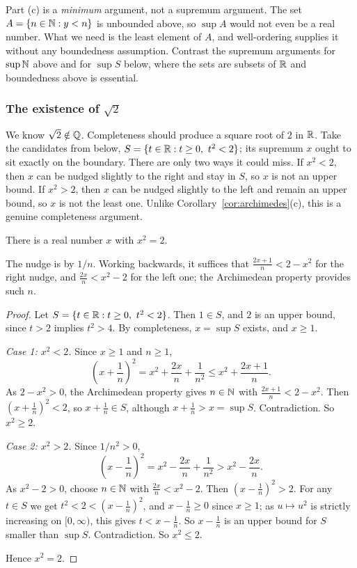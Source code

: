 \begin{warning}
  Part (c) is a \emph{minimum} argument, not a supremum argument. The set
  $A = \{n \in \mathbb{N} : y < n\}$ is unbounded above, so $\sup A$ would not even
  be a real number. What we need is the least element of $A$, and
  well-ordering supplies it without any boundedness assumption. Contrast the
  supremum arguments for $\sup \mathbb{N}$ above and for $\sup S$ below, where the
  sets are subsets of $\mathbb{R}$ and boundedness above is essential.
\end{warning}

\subsubsection*{The existence of \texorpdfstring{$\sqrt{2}$}{sqrt 2}}
We know $\sqrt{2} \notin \mathbb{Q}$. Completeness should produce a square root of
$2$ in $\mathbb{R}$. Take the candidates from below,
$S = \{t \in \mathbb{R} : t \geq 0,\ t^2 < 2\}$; its supremum $x$ ought to sit
exactly on the boundary. There are only two ways it could miss. If
$x^2 < 2$, then $x$ can be nudged slightly to the right and stay in $S$, so
$x$ is not an upper bound. If $x^2 > 2$, then $x$ can be nudged slightly to
the left and remain an upper bound, so $x$ is not the least one. Unlike
Corollary~\ref{cor:archimedes}(c), this is a genuine completeness argument.

\begin{nprop}\label{prop:sqrt2-exists}
  There is a real number $x$ with $x^2 = 2$.
\end{nprop}
The nudge is by $1/n$. Working backwards, it suffices that
$\frac{2x + 1}{n} < 2 - x^2$ for the right nudge, and $\frac{2x}{n} < x^2 - 2$
for the left one; the Archimedean property provides such $n$.

\begin{proof}
  Let $S = \{t \in \mathbb{R} : t \geq 0,\ t^2 < 2\}$. Then $1 \in S$, and $2$ is an
  upper bound, since $t > 2$ implies $t^2 > 4$. By completeness,
  $x = \sup S$ exists, and $x \geq 1$.

  \emph{Case 1: $x^2 < 2$.} Since $x \geq 1$ and $n \geq 1$,
  \[
    \left(x + \frac{1}{n}\right)^2 = x^2 + \frac{2x}{n} + \frac{1}{n^2} \leq x^2 + \frac{2x + 1}{n}.
  \]
  As $2 - x^2 > 0$, the Archimedean property gives $n \in \mathbb{N}$ with
  $\frac{2x + 1}{n} < 2 - x^2$. Then $\left(x + \frac{1}{n}\right)^2 < 2$,
  so $x + \frac{1}{n} \in S$, although $x + \frac{1}{n} > x = \sup S$.
  Contradiction. So $x^2 \geq 2$.

  \emph{Case 2: $x^2 > 2$.} Since $1/n^2 > 0$,
  \[
    \left(x - \frac{1}{n}\right)^2 = x^2 - \frac{2x}{n} + \frac{1}{n^2} > x^2 - \frac{2x}{n}.
  \]
  As $x^2 - 2 > 0$, choose $n \in \mathbb{N}$ with $\frac{2x}{n} < x^2 - 2$. Then
  $\left(x - \frac{1}{n}\right)^2 > 2$. For any $t \in S$ we get
  $t^2 < 2 < \left(x - \frac{1}{n}\right)^2$, and $x - \frac{1}{n} \geq 0$
  since $x \geq 1$; as $u \mapsto u^2$ is strictly increasing on
  $[0, \infty)$, this gives $t < x - \frac{1}{n}$. So $x - \frac{1}{n}$ is
  an upper bound for $S$ smaller than $\sup S$. Contradiction. So
  $x^2 \leq 2$.

  Hence $x^2 = 2$.
\end{proof}


